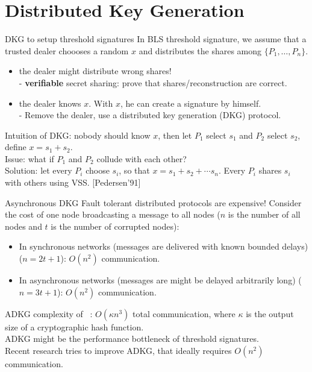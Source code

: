 \section{Distributed Key Generation}


\begin{frame}{DKG to setup threshold signatures}
    In BLS threshold signature, we assume that a trusted dealer choooses a random $x$ and distributes the shares among $\{P_1,\dots, P_n\}$. \\
    \begin{itemize}
        \item the dealer might distribute wrong shares! \\ \pause 
              - \textbf{verifiable} secret sharing: prove that shares/reconstruction are correct.   \pause 
        \item the dealer knows $x$. With $x$, he can create a signature by himself. \\ \pause
            - Remove the dealer, use a distributed key generation (DKG) protocol. 
    \end{itemize}
    \pause 
    \vspace{0.5em}
    Intuition of DKG: nobody should know $x$, then let $P_1$ select $s_1$ and $P_2$ select $s_2$, define $x=s_1+s_2$. \\ \pause 
    \vspace{0.5em}
    Issue: what if $P_1$ and $P_2$ collude with each other? \\ \pause 
    Solution: let every $P_i$ choose $s_i$, so that $x=s_1+s_2+\cdots s_n$. Every $P_i$ shares $s_i$ with others using VSS.  [Pedersen'91]
\end{frame}



\begin{frame}{Asynchronous DKG}
    Fault tolerant distributed protocols are expensive! Consider the cost of one node broadcasting a message to all nodes ($n$ is the number of all nodes and $t$ is the number of corrupted nodes): 
    \begin{itemize}
        \item In synchronous networks (messages are delivered with known bounded delays) ($n=2t+1$): $O(n^2)$ communication. 
        \item In asynchronous networks (messages are might be delayed arbitrarily long) ($n=3t+1$): $O(n^2)$ communication. 
    \end{itemize}
    ADKG complexity of ~\cite{DBLP:conf/sp/DasYXMK022}: $O(\kappa n^3)$ total communication, where $\kappa$ is the output size of a cryptographic hash function. \\
    ADKG might be the performance bottleneck of threshold signatures. \\
    \vspace{0.5em}
    Recent research tries to improve ADKG, that ideally requires $O(n^2)$ communication. 
    \end{frame}